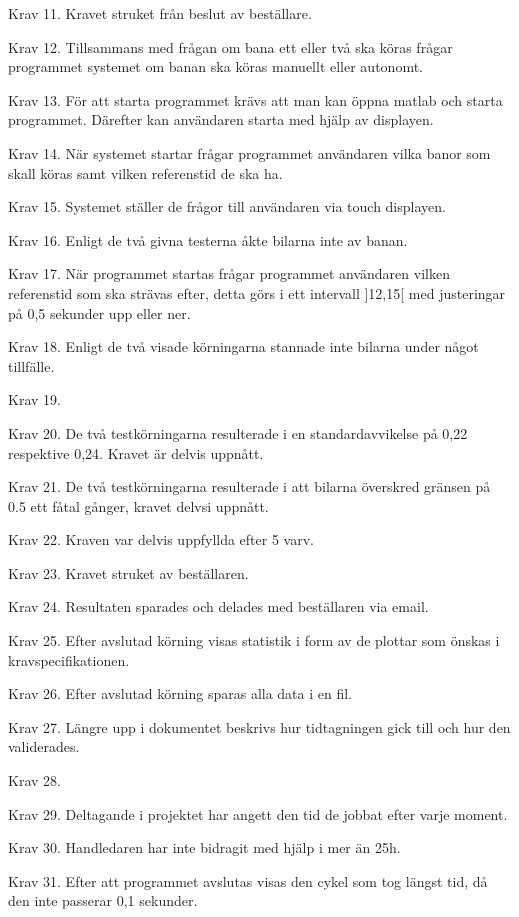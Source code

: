 \documentclass[10pt,oneside,swedish]{lips-no_customer}
\begin{document}
Krav 11. Kravet struket från beslut av beställare. 

Krav 12. Tillsammans med frågan om bana ett eller två ska köras frågar
programmet systemet om banan ska köras manuellt eller autonomt. 

Krav 13. För att starta programmet krävs att man kan öppna matlab och starta
programmet. Därefter kan användaren starta med hjälp av displayen.  
 
Krav 14. När systemet startar frågar programmet användaren vilka banor som skall
köras samt vilken referenstid de ska ha. 

Krav 15. Systemet ställer de frågor till användaren via touch displayen.

Krav 16. Enligt de två givna testerna åkte bilarna inte av banan.

Krav 17. När programmet startas frågar programmet användaren vilken referenstid
som ska strävas efter, detta görs i ett intervall ]12,15[ med justeringar på 0,5
sekunder upp eller ner. 

Krav 18. Enligt de två visade körningarna stannade inte bilarna under något
tillfälle. 

Krav 19. 

Krav 20. De två testkörningarna resulterade i en standardavvikelse på 0,22
respektive 0,24. Kravet är delvis uppnått. 

Krav 21. De två testkörningarna resulterade i att bilarna överskred gränsen på
0.5 ett fåtal gånger, kravet delvsi uppnått. 

Krav 22. Kraven var delvis uppfyllda efter 5 varv. 

Krav 23. Kravet struket av beställaren. 

Krav 24. Resultaten sparades och delades med beställaren via email.  

Krav 25. Efter avslutad körning visas statistik i form av de plottar som önskas
i kravspecifikationen. 

Krav 26. Efter avslutad körning sparas alla data i en fil.  

Krav 27. Längre upp i dokumentet beskrivs hur tidtagningen gick till och hur den
validerades.

Krav 28. 

Krav 29. Deltagande i projektet har angett den tid de jobbat efter varje moment. 

Krav 30. Handledaren har inte bidragit med hjälp i mer än 25h.

Krav 31. Efter att programmet avslutas visas den cykel som tog längst tid, då
den inte passerar 0,1 sekunder. 
\end{document}
